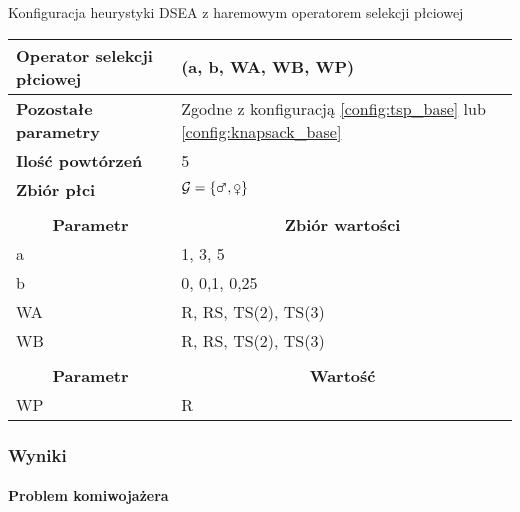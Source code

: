 \documentclass[./FM_mgr.tex]{subfiles}
\begin{document}
\begin{config}
	\caption{Konfiguracja heurystyki DSEA z haremowym operatorem selekcji płciowej \label{config:dsea_harem}}
	\begin{tabularx}{\linewidth}{lX}
		\hline
		\multicolumn{1}{|l|}{\textbf{Operator selekcji płciowej}} &
		\multicolumn{1}{l|}{\opName{harem}(a, b, WA, WB, WP)} \\ 
		\hline
		\multicolumn{1}{|l|}{\textbf{Pozostałe parametry}} &
		\multicolumn{1}{l|}{Zgodne z konfiguracją \ref{config:tsp_base} lub \ref{config:knapsack_base}} \\ 
		\hline
		\multicolumn{1}{|l|}{\textbf{Ilość powtórzeń}} &
		\multicolumn{1}{l|}{5} \\ 
		\hline
		\multicolumn{1}{|l|}{\textbf{Zbiór płci}} & 
		\multicolumn{1}{l|}{$\important{G} = \{ \male, \female \}$} \\ 
		\hline
		& \\ 
		\hline
		\multicolumn{1}{|c|}{\textbf{Parametr}} & 
		\multicolumn{1}{c|}{\textbf{Zbiór wartości}} \\ 
		\hline \hline
		\multicolumn{1}{|l|}{a} & 
		\multicolumn{1}{l|}{1, 3, 5} \\ 
		\hline
		\multicolumn{1}{|l|}{b} & 
		\multicolumn{1}{l|}{0, 0,1, 0,25} \\ 
		\hline
		\multicolumn{1}{|l|}{WA} & 
		\multicolumn{1}{l|}{R, RS, TS(2), TS(3)} \\ 
		\hline
		\multicolumn{1}{|l|}{WB} & 
		\multicolumn{1}{l|}{R, RS, TS(2), TS(3)} \\ 
		\hline
		& \\ 
		\hline
		\multicolumn{1}{|c|}{\textbf{Parametr}} & 
		\multicolumn{1}{c|}{\textbf{Wartość}} \\ 
		\hline \hline
		\multicolumn{1}{|l|}{WP} &
		\multicolumn{1}{l|}{R} \\ 
		\hline
	\end{tabularx}
\end{config}

\subsubsection{Wyniki}

\paragraph{Problem komiwojażera}
\end{document}
